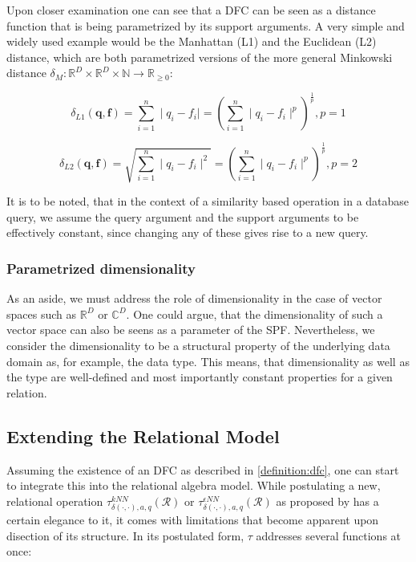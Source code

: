 Upon closer examination one can see that a DFC can be seen as a distance function that is being parametrized by its support arguments. A very simple and widely used example would be the Manhattan (L1) and the Euclidean (L2) distance, which are both parametrized versions of the more general Minkowski distance $\delta_{M} \colon \mathbb{R}^{D} \times \mathbb{R}^{D} \times \mathbb{N} \to \mathbb{R}_{\geq 0}$:


\begin{equation}
    \delta_{L1}(\mathbf{q},\mathbf{f}) = \sum_{i=1}^{n} \mid q_i - f_i \mid = \left(\sum_{i=1}^{n} \mid q_i - f_i \mid^p\right)^{\frac{1}{p}}, p = 1
\end{equation}

\begin{equation}
    \delta_{L2}(\mathbf{q},\mathbf{f}) = \sqrt{\sum_{i=1}^{n} \mid q_i - f_i \mid^2}= \left(\sum_{i=1}^{n} \mid q_i - f_i \mid^p\right)^{\frac{1}{p}}, p = 2
\end{equation}

It is to be noted, that in the context of a similarity based operation in a database query, we assume  the query argument and the support arguments to be effectively constant, since changing any of these gives rise to a new query.

\subsubsection{Parametrized dimensionality}
As an aside, we must address the role of dimensionality in the case of vector spaces such as $\mathbb{R}^{D}$ or $\mathbb{C}^{D}$. One could argue, that the dimensionality of such a vector space can also be seens as a parameter of the SPF. Nevertheless, we consider the dimensionality to be a structural property of the underlying data domain as, for example, the data type. This means, that dimensionality as well as the type are well-defined and most importantly constant properties for a given relation.

\subsection{Extending the Relational Model}

Assuming the existence of an DFC as described in \cref{definition:dfc}, one can start to integrate this into the relational algebra model. While postulating a new, relational operation $\tau^{kNN}_{\delta(\cdot,\cdot),a,q}(\mathcal{R})$ or $\tau^{\epsilon NN}_{\delta(\cdot,\cdot),a,q}(\mathcal{R})$ as proposed by \cite{Giangreco:2018thesis} has a certain elegance to it, it  comes with limitations that become apparent upon disection of its structure. In its postulated form, $\tau$ addresses several functions at once:

